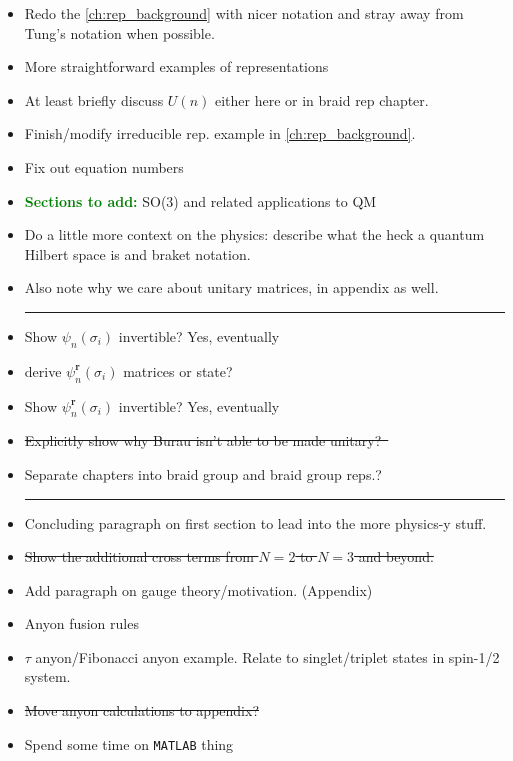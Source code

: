 \begin{itemize}

    \item Redo the \cref{ch:rep_background} with nicer notation and stray away from Tung's notation when possible.
    \item More straightforward examples of representations
    \item At least briefly discuss $U(n)$ either here or in braid rep chapter.
    \item Finish/modify irreducible rep. example in \cref{ch:rep_background}.
    \item Fix out equation numbers
    \item \textcolor{Green}{\textbf{Sections to add:}} SO(3) and related applications to QM
    \item Do a little more context on the physics: describe what the heck a quantum Hilbert space is and braket notation.
    \item Also note why we care about unitary matrices, in appendix as well.
    
    \begin{center}\rule{.85\textwidth}{0.65pt}\end{center}
    
    \item Show $\psi_n(\sigma_i)$ invertible? Yes, eventually
    \item derive $\psi_n^\textbf{r}(\sigma_i)$ matrices or state?
    \item Show $\psi_n^\textbf{r}(\sigma_i)$ invertible? Yes, eventually
    \item \sout{Explicitly show why Burau isn't able to be made unitary?~\cite{Delaney2016}}
    \item Separate chapters into braid group and braid group reps.?
    
    \begin{center}\rule{.85\textwidth}{0.65pt}\end{center}
    
    \item Concluding paragraph on first section to lead into the more physics-y stuff.
    \item \sout{Show the additional cross terms from $N=2$ to $N=3$ and beyond.}
    \item Add paragraph on gauge theory/motivation. (Appendix)
    \item Anyon fusion rules
    \item $\tau$ anyon/Fibonacci anyon example. Relate to singlet/triplet states in spin-1/2 system.
    \item \sout{Move anyon calculations to appendix?}
    \item Spend some time on \texttt{MATLAB} thing


\end{itemize}
